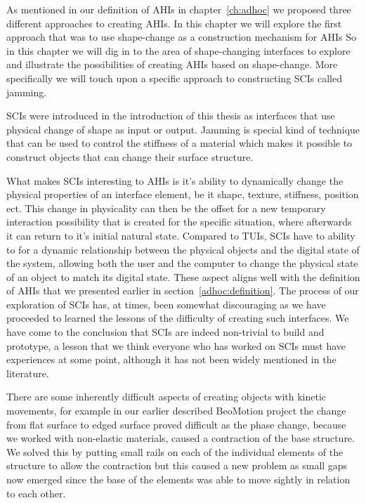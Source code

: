 As mentioned in our definition of AHIs in chapter~\ref{ch:adhoc} we proposed three different approaches to creating AHIs.
In this chapter we will explore the first approach that was to use shape-change as a construction mechanism for AHIs
So in this chapter we will dig in to the area of shape-changing interfaces to explore and illustrate the possibilities of creating AHIs based on shape-change.
More specifically we will touch upon a specific approach to constructing SCIs called jamming.

SCIs were introduced in the introduction of this thesis as interfaces that use physical change of shape as input or output.
Jamming is special kind of technique that can be used to control the stiffness of a material which makes it possible to construct objects that can change their surface structure.

What makes SCIs interesting to AHIs is it's ability to dynamically change the physical properties of an interface element, be it shape, texture, stiffness, position ect.
This change in physicality can then be the offset for a new temporary interaction possibility that is created for the specific situation, where afterwards it can return to it's initial natural state.
Compared to TUIs, SCIs have to ability to for a dynamic relationship between the physical objects and the digital state of the system, allowing both the user and the computer to change the physical state of an object to match its digital state.
These aspect aligns well with the definition of AHIs that we presented earlier in section~\ref{adhoc:definition}.
\blank
The process of our exploration of SCIs has, at times, been somewhat discouraging as we have proceeded to learned the lessons of the difficulty of creating such interfaces.
We have come to the conclusion that SCIs are indeed non-trivial to build and prototype, a lesson that we think everyone who has worked on SCIs must have experiences at some point, although it has not been widely mentioned in the literature. 

There are some inherently difficult aspects of creating objects with kinetic movements, for example in our earlier described BeoMotion project the change from flat surface to edged surface proved difficult as the phase change, because we worked with non-elastic materials, caused a contraction of the base structure.
We solved this by putting small rails on each of the individual elements of the structure to allow the contraction but this caused a new problem as small gaps now emerged since the base of the elements was able to move sightly in relation to each other.

